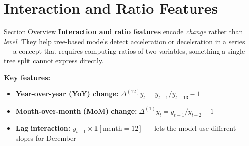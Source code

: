\documentclass[aspectratio=169, 10pt]{beamer}
\begin{document}
\section{Interaction and Ratio Features}


\begin{frame}{Section Overview}
  \textbf{Interaction and ratio features} encode \emph{change}
  rather than \emph{level}. They help tree-based models detect
  acceleration or deceleration in a series --- a concept that
  requires computing ratios of two variables, something a single
  tree split cannot express directly.

  \medskip
  \textbf{Key features:}
  \begin{itemize}
    \item \textbf{Year-over-year (YoY) change:}
          $\Delta^{(12)} y_t = y_{t-1} / y_{t-13} - 1$
    \item \textbf{Month-over-month (MoM) change:}
          $\Delta^{(1)} y_t = y_{t-1} / y_{t-2} - 1$
    \item \textbf{Lag interaction:}
          $y_{t-1} \times \mathbf{1}[\text{month} = 12]$ ---
          lets the model use different slopes for December
  \end{itemize}
\end{frame}
\end{document}
